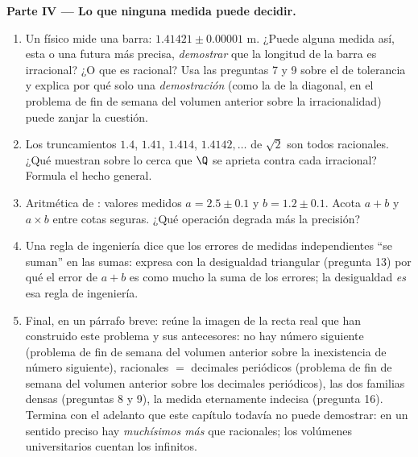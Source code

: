 \begin{problem}
\medskip
\noindent\textbf{Parte IV --- Lo que ninguna medida puede decidir.}
\begin{enumerate}[resume]
  \item Un físico mide una barra: $1.41421 \pm 0.00001$ m. ¿Puede alguna
        medida así, esta o una futura más precisa, \emph{demostrar} que la
        longitud de la barra es irracional? ¿O que es racional? Usa las
        preguntas 7 y 9 sobre el  de tolerancia y explica por qué
        solo una \emph{demostración} (como la de la diagonal, en el
        problema de fin de semana del volumen anterior sobre la
        irracionalidad) puede zanjar la cuestión.
  \item Los truncamientos $1.4$, $1.41$, $1.414$, $1.4142,\dots$ de
        $\sqrt2$ son todos racionales. ¿Qué muestran sobre lo cerca que
        $\Q$ se aprieta contra cada irracional? Formula el hecho general.
  \item Aritmética de : valores medidos $a = 2.5 \pm 0.1$ y
        $b = 1.2 \pm 0.1$. Acota $a + b$ y $a \times b$ entre cotas
        seguras. ¿Qué operación degrada más la precisión?
  \item Una regla de ingeniería dice que los errores de medidas
        independientes ``se suman'' en las sumas: expresa con la
        desigualdad triangular (pregunta 13) por qué el error de $a + b$
        es como mucho la suma de los errores; la desigualdad \emph{es} esa
        regla de ingeniería.
  \item Final, en un párrafo breve: reúne la imagen de la recta real que
        han construido este problema y sus antecesores: no hay número
        siguiente (problema de fin de semana del volumen anterior sobre la
        inexistencia de número siguiente), racionales $=$ decimales
        periódicos (problema de fin de semana del volumen anterior sobre
        los decimales periódicos), las dos familias densas (preguntas 8 y
        9), la medida eternamente indecisa (pregunta 16). Termina con el
        adelanto que este capítulo todavía no puede demostrar: en un
        sentido preciso hay \emph{muchísimos más}  que
        racionales; los volúmenes universitarios cuentan los infinitos.
\end{enumerate}
\end{problem}
